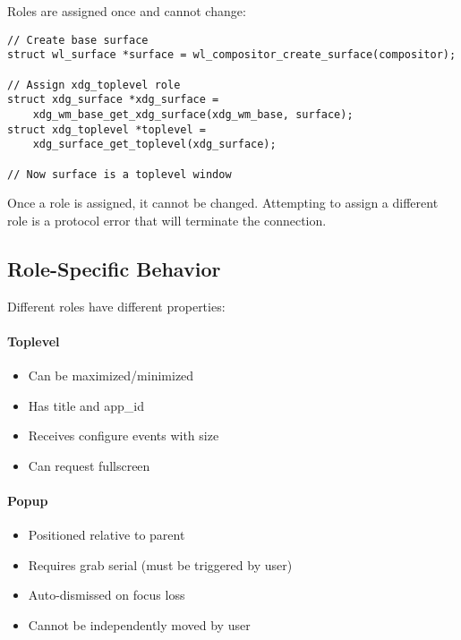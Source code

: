 Roles are assigned once and cannot change:

\begin{lstlisting}[style=cstyle, caption=Assigning Roles]
// Create base surface
struct wl_surface *surface = wl_compositor_create_surface(compositor);

// Assign xdg_toplevel role
struct xdg_surface *xdg_surface =
    xdg_wm_base_get_xdg_surface(xdg_wm_base, surface);
struct xdg_toplevel *toplevel =
    xdg_surface_get_toplevel(xdg_surface);

// Now surface is a toplevel window
\end{lstlisting}

\begin{warningbox}
Once a role is assigned, it cannot be changed. Attempting to assign a different role is a protocol error that will terminate the connection.
\end{warningbox}

\subsection{Role-Specific Behavior}

Different roles have different properties:

\paragraph{Toplevel}
\begin{itemize}
    \item Can be maximized/minimized
    \item Has title and app\_id
    \item Receives configure events with size
    \item Can request fullscreen
\end{itemize}

\paragraph{Popup}
\begin{itemize}
    \item Positioned relative to parent
    \item Requires grab serial (must be triggered by user)
    \item Auto-dismissed on focus loss
    \item Cannot be independently moved by user
\end{itemize}

